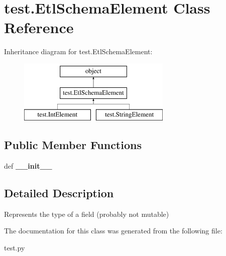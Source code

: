 \hypertarget{classtest_1_1EtlSchemaElement}{\section{test.\-Etl\-Schema\-Element Class Reference}
\label{classtest_1_1EtlSchemaElement}
}
Inheritance diagram for test.\-Etl\-Schema\-Element\-:\begin{figure}[H]
\begin{center}
\leavevmode
\includegraphics[height=3.000000cm]{classtest_1_1EtlSchemaElement}
\end{center}
\end{figure}
\subsection*{Public Member Functions}
\begin{DoxyCompactItemize}
\item 
\hypertarget{classtest_1_1EtlSchemaElement_ae98c322cdf58fdc76da68d1839041016}{def {\bfseries \-\_\-\-\_\-init\-\_\-\-\_\-}}\label{classtest_1_1EtlSchemaElement_ae98c322cdf58fdc76da68d1839041016}

\end{DoxyCompactItemize}


\subsection{Detailed Description}
\begin{DoxyVerb}Represents the type of a field (probably not mutable)\end{DoxyVerb}
 

The documentation for this class was generated from the following file\-:\begin{DoxyCompactItemize}
\item 
test.\-py\end{DoxyCompactItemize}
